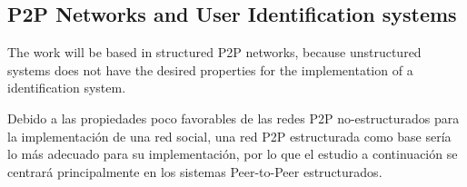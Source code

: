 %
%
%
%
%
%



\subsection{P2P Networks and User Identification systems}

The work will be based in structured P2P networks, because unstructured
systems does not have the desired properties for the implementation of a
identification system. 

Debido a las propiedades poco favorables de las redes P2P no-estructurados para la implementación de una red
social, una red P2P estructurada como base sería lo más adecuado para su
implementación, por lo que el estudio a continuación se centrará  principalmente
en los sistemas Peer-to-Peer estructurados.

